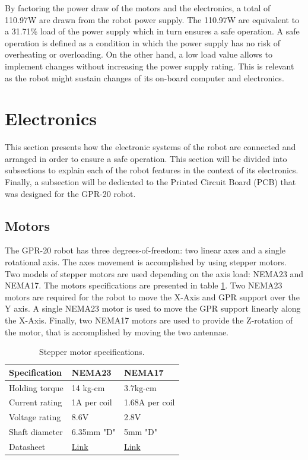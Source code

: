 \documentclass{article}
\begin{document}
By factoring the power draw of the motors and the electronics, a total of 110.97W are drawn from the robot power supply. The 110.97W are equivalent to a 31.71\% load of the power supply which in turn ensures a safe operation. A safe operation is defined as a condition in which the power supply has no risk of overheating or overloading. On the other hand, a low load value allows to implement changes without increasing the power supply rating. This is relevant as the robot might sustain changes of its on-board computer and electronics.

\clearpage
\section{Electronics}
This section presents how the electronic systems of the robot are connected and arranged in order to ensure a safe operation. This section will be divided into subsections to explain each of the robot features in the context of its electronics. Finally, a subsection will be dedicated to the Printed Circuit Board (PCB) that was designed for the GPR-20 robot.

\subsection{Motors}
The GPR-20 robot has three degrees-of-freedom: two linear axes and a single rotational axis. The axes movement is accomplished by using stepper motors. Two models of stepper motors are used depending on the axis load: NEMA23 and NEMA17. The motors specifications are presented in table \ref{tab:motor_specs}. Two NEMA23 motors are required for the robot to move the X-Axis and GPR support over the Y axis. A single NEMA23 motor is used to move the GPR support linearly along the X-Axis. Finally, two NEMA17 motors are used to provide the Z-rotation of the motor, that is accomplished by moving the two antennae.

\begin{table}[h]
    \centering
    \begin{tabular}{|l|l|l|}
        \hline \textbf{Specification} & \textbf{NEMA23} & \textbf{NEMA17} \\ \hline
        Holding torque & 14 kg-cm & 3.7kg-cm \\ \hline
        Current rating & 1A per coil & 1.68A per coil \\ \hline
        Voltage rating & 8.6V & 2.8V \\ \hline
        Shaft diameter & 6.35mm "D" & 5mm "D" \\ \hline
        Datasheet & \href{https://www.pololu.com/product/1477}{Link} & \href{https://www.pololu.com/product/2267}{Link} \\ \hline
    \end{tabular}
    \caption{Stepper motor specifications.}
    \label{tab:motor_specs}
\end{table}
\end{document}
